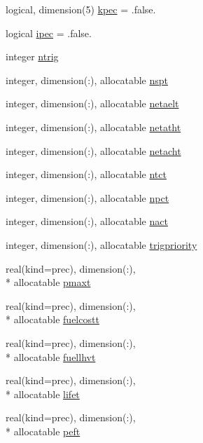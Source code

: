 \begin{DoxyCompactItemize}
\item 
logical, dimension(5) \hyperlink{classinputvar_a17bd2d4ef6c3b43e7b2d447f1fab021e}{kpec} = .false.
\item 
logical \hyperlink{classinputvar_af90e08308cf6a7de1480cfde429187d3}{ipec} = .false.
\item 
integer \hyperlink{classinputvar_ae4403f5c5b16bf2cbd2b607a87e5ee9a}{ntrig}
\item 
integer, dimension(\-:), allocatable \hyperlink{classinputvar_a0c86e9a7915872ee547e5bd8802611e7}{nspt}
\item 
integer, dimension(\-:), allocatable \hyperlink{classinputvar_a2bfcb389a7fba156b8c1146150a71f51}{netaelt}
\item 
integer, dimension(\-:), allocatable \hyperlink{classinputvar_acebcf3d64f116183dd364e920288729f}{netatht}
\item 
integer, dimension(\-:), allocatable \hyperlink{classinputvar_a7f82eda09f512dfe2f28f82efc5187ad}{netacht}
\item 
integer, dimension(\-:), allocatable \hyperlink{classinputvar_ad5c9bbca95851da9fa84642ea414e6be}{ntct}
\item 
integer, dimension(\-:), allocatable \hyperlink{classinputvar_a0f5eeaa6713564c7a3aa547b8ce8bae9}{npct}
\item 
integer, dimension(\-:), allocatable \hyperlink{classinputvar_aecb7a7ef500aee2174166b23b5c72e2a}{nact}
\item 
integer, dimension(\-:), allocatable \hyperlink{classinputvar_aa06cb5d284b385bcfed4e6f34efa534f}{trigpriority}
\item 
real(kind=prec), dimension(\-:), \\*
allocatable \hyperlink{classinputvar_a0a9434332c855a12ef886b675af68d35}{pmaxt}
\item 
real(kind=prec), dimension(\-:), \\*
allocatable \hyperlink{classinputvar_a85ccff6d868e650d2255bb9faa7c31be}{fuelcostt}
\item 
real(kind=prec), dimension(\-:), \\*
allocatable \hyperlink{classinputvar_afe467edd87c4c589d3ad9d5b14825f94}{fuellhvt}
\item 
real(kind=prec), dimension(\-:), \\*
allocatable \hyperlink{classinputvar_a04abed47801bdfcda1ecba21b90ab85b}{lifet}
\item 
real(kind=prec), dimension(\-:), \\*
allocatable \hyperlink{classinputvar_ab6d8921a6209783f0f51673c842f94b5}{peft}

\end{DoxyCompactItemize}
